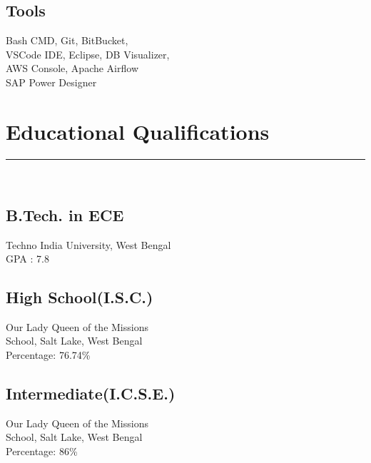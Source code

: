 \documentclass[]{DD_Resume_23}
\begin{document}
\begin{minipage}[t]{0.33\textwidth}
\subsection{Tools}
Bash CMD, Git, BitBucket,\\
VSCode IDE, Eclipse, DB Visualizer,\\
AWS Console, Apache Airflow\\
SAP Power Designer
\sectionsep
\section{Educational Qualifications} 
\noindent\rule{5cm}{0.4pt}\\
\subsection{B.Tech. in ECE}
Techno India University, West Bengal \\
GPA : 7.8\\
\vspace{8pt}
\subsection{High School(I.S.C.)}
Our Lady Queen of the Missions\\
School, Salt Lake, West Bengal\\
Percentage: 76.74\%\\
\vspace{8pt}
\subsection{Intermediate(I.C.S.E.)}
Our Lady Queen of the Missions\\
School, Salt Lake, West Bengal\\
Percentage: 86\%
\sectionsep
%
%

\end{minipage} 
\hfill
\end{document}
